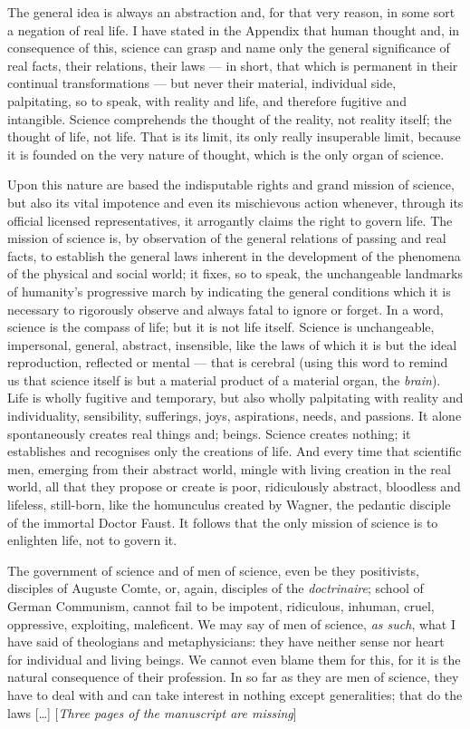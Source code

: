 \documentclass[12pt]{report}
\begin{document}
The general idea is always an abstraction and, for that very reason, in some sort a negation of real life. I have stated in the Appendix that human thought and, in consequence of this, science can grasp and name only the general significance of real facts, their relations, their laws — in short, that which is permanent in their continual transformations — but never their material, individual side, palpitating, so to speak, with reality and life, and therefore fugitive and intangible. Science comprehends the thought of the reality, not reality itself; the thought of life, not life. That is its limit, its only really insuperable limit, because it is founded on the very nature of thought, which is the only organ of science.


Upon this nature are based the indisputable rights and grand mission of science, but also its vital impotence and even its mischievous action whenever, through its official licensed representatives, it arrogantly claims the right to govern life. The mission of science is, by observation of the general relations of passing and real facts, to establish the general laws inherent in the development of the phenomena of the physical and social world; it fixes, so to speak, the unchangeable landmarks of humanity’s progressive march by indicating the general conditions which it is necessary to rigorously observe and always fatal to ignore or forget. In a word, science is the compass of life; but it is not life itself. Science is unchangeable, impersonal, general, abstract, insensible, like the laws of which it is but the ideal reproduction, reflected or mental — that is cerebral (using this word to remind us that science itself is but a material product of a material organ, the \emph{brain}). Life is wholly fugitive and temporary, but also wholly palpitating with reality and individuality, sensibility, sufferings, joys, aspirations, needs, and passions. It alone spontaneously creates real things and; beings. Science creates nothing; it establishes and recognises only the creations of life. And every time that scientific men, emerging from their abstract world, mingle with living creation in the real world, all that they propose or create is poor, ridiculously abstract, bloodless and lifeless, still-born, like the homunculus created by Wagner, the pedantic disciple of the immortal Doctor Faust. It follows that the only mission of science is to enlighten life, not to govern it.


The government of science and of men of science, even be they positivists, disciples of Auguste Comte, or, again, disciples of the \emph{doctrinaire}; school of German Communism, cannot fail to be impotent, ridiculous, inhuman, cruel, oppressive, exploiting, maleficent. We may say of men of science, \emph{as such}, what I have said of theologians and metaphysicians: they have neither sense nor heart for individual and living beings. We cannot even blame them for this, for it is the natural consequence of their profession. In so far as they are men of science, they have to deal with and can take interest in nothing except generalities; that do the laws [\dots{}] [\textit{Three pages of the manuscript are missing}]
\end{document}
